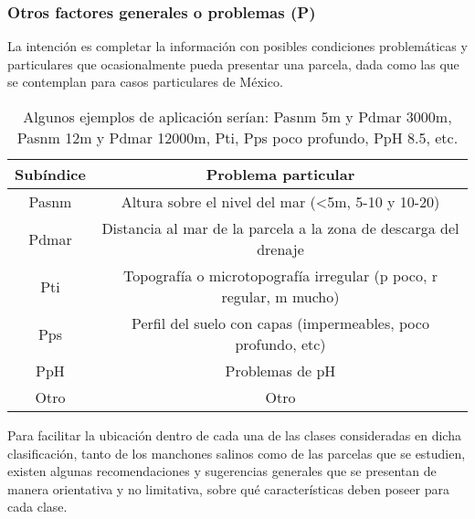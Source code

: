 \subsubsection{Otros factores generales o problemas (P)}
La intención es completar la información con posibles condiciones problemáticas y particulares que ocasionalmente pueda presentar una parcela, dada como las que se contemplan para casos particulares de México.
\begin{table}[h!]
    \centering
    \begin{tabular}{@{}cc@{}}
    \toprule
    Subíndice & Problema particular                                                 \\ \midrule
    Pasnm     & Altura sobre el nivel del mar (\textless{}5m, 5-10 y 10-20)         \\
    Pdmar     & Distancia al mar de la parcela a la zona de descarga del drenaje    \\
    Pti       & Topografía o microtopografía irregular (p poco, r regular, m mucho) \\
    Pps       & Perfil del suelo con capas (impermeables, poco profundo, etc)       \\
    PpH       & Problemas de pH                                                     \\
    Otro      & Otro                                                                \\ \bottomrule
    \end{tabular}
    \caption{Algunos ejemplos de aplicación serían: Pasnm 5m y Pdmar 3000m, Pasnm 12m y Pdmar 12000m, Pti, Pps poco profundo, PpH 8.5, etc.}
    \label{tabs32}
\end{table}

Para facilitar la ubicación dentro de cada una de las clases consideradas en dicha clasificación, tanto de los manchones salinos como de las parcelas que se estudien, existen algunas recomendaciones y sugerencias generales que se presentan de manera orientativa y no limitativa, sobre qué características deben poseer para cada clase.

